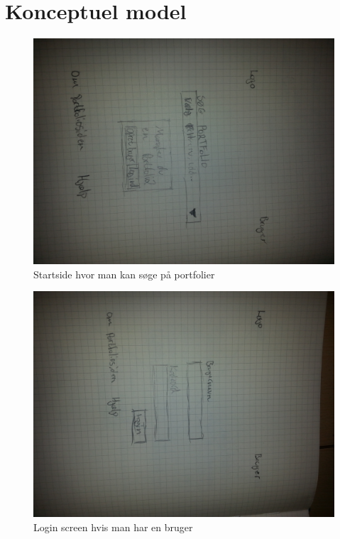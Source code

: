 \documentclass[a4paper,titlepage,fleqn,12pt]{article}
\begin{document}
\section{Konceptuel model}

\begin{figure}[H]
\includegraphics[width=\textwidth]{startside.jpg}
\caption{Startside hvor man kan søge på portfolier}
\end{figure}

\begin{figure}[H]
\includegraphics[width=\textwidth]{login.jpg}
\caption{Login screen hvis man har en bruger}
\end{figure}
\end{document}
